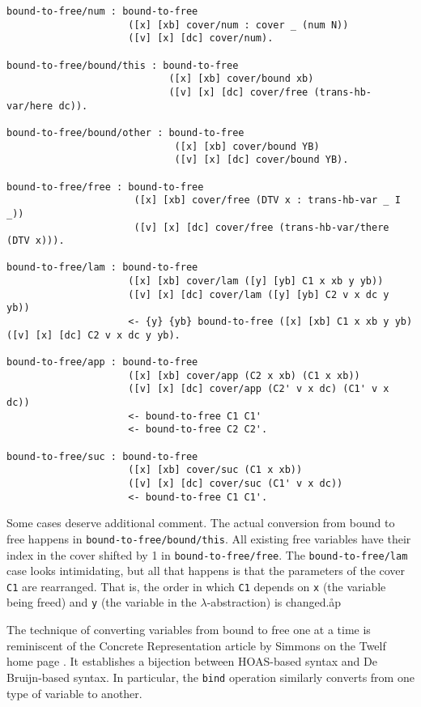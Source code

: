 \begin{verbatim}
bound-to-free/num : bound-to-free
                     ([x] [xb] cover/num : cover _ (num N))
                     ([v] [x] [dc] cover/num).

bound-to-free/bound/this : bound-to-free
                            ([x] [xb] cover/bound xb)
                            ([v] [x] [dc] cover/free (trans-hb-var/here dc)).

bound-to-free/bound/other : bound-to-free
                             ([x] [xb] cover/bound YB)
                             ([v] [x] [dc] cover/bound YB).

bound-to-free/free : bound-to-free
                      ([x] [xb] cover/free (DTV x : trans-hb-var _ I _))
                      ([v] [x] [dc] cover/free (trans-hb-var/there (DTV x))).

bound-to-free/lam : bound-to-free
                     ([x] [xb] cover/lam ([y] [yb] C1 x xb y yb))
                     ([v] [x] [dc] cover/lam ([y] [yb] C2 v x dc y yb))
                     <- {y} {yb} bound-to-free ([x] [xb] C1 x xb y yb) ([v] [x] [dc] C2 v x dc y yb).

bound-to-free/app : bound-to-free
                     ([x] [xb] cover/app (C2 x xb) (C1 x xb))
                     ([v] [x] [dc] cover/app (C2' v x dc) (C1' v x dc))
                     <- bound-to-free C1 C1'
                     <- bound-to-free C2 C2'.

bound-to-free/suc : bound-to-free
                     ([x] [xb] cover/suc (C1 x xb))
                     ([v] [x] [dc] cover/suc (C1' v x dc))
                     <- bound-to-free C1 C1'.
\end{verbatim}
Some cases deserve additional comment.
The actual conversion from bound to free happens in \texttt{bound-to-free/bound/this}.
All existing free variables have their index in the cover shifted by 1 in \texttt{bound-to-free/free}.
The \texttt{bound-to-free/lam} case looks intimidating, but all that happens is that the parameters of the cover \texttt{C1} are rearranged.
That is, the order in which \texttt{C1} depends on \texttt{x} (the variable being freed) and \texttt{y} (the variable in the $\lambda$-abstraction) is changed.åp

The technique of converting variables from bound to free one at a time is reminiscent of the Concrete Representation article by Simmons on the Twelf home page \cite{Simmons07}.
It establishes a bijection between HOAS-based syntax and De Bruijn-based syntax.
In particular, the \texttt{bind} operation similarly converts from one type of variable to another.

